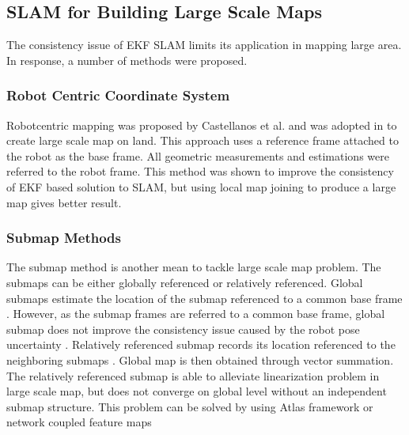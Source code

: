 \subsection{SLAM for Building Large Scale Maps}
The consistency issue of EKF SLAM limits its application in mapping
large area. In response, a number of methods were proposed.

\subsubsection{Robot Centric Coordinate System}
Robotcentric mapping was proposed by Castellanos et al.
\cite{castellanos_limits_2004} and was adopted in
\cite{civera_1-point_2009} to create large scale map on land. This
approach uses a reference frame attached to the robot as the base
frame. All geometric measurements and estimations were referred to the
robot frame. This method was shown to improve the consistency of EKF
based solution to SLAM, but using local map joining to produce a large
map gives better result.

\subsubsection{Submap Methods}
The submap method is another mean to tackle large scale map problem.
The submaps can be either globally referenced or relatively
referenced. Global submaps estimate the location of the submap
referenced to a common base frame \cite{estrada_hierarchical_2005}
\cite{leonard_consistent_2003}. However, as the submap frames are
referred to a common base frame, global submap does not improve the
consistency issue caused by the robot pose
uncertainty \cite{bailey_simultaneous_2006}. Relatively referenced
submap records its location referenced to the neighboring submaps
\cite{chong_feature-based_1999} \cite{williams_efficient_2001}. Global
map is then obtained through vector summation. The relatively
referenced submap is able to alleviate linearization problem in large
scale map, but does not converge on global level without an
independent submap structure. This problem can be solved by using
Atlas framework or network coupled feature maps \cite{bosse_slam_2004}
\cite{bailey_mobile_2002}

